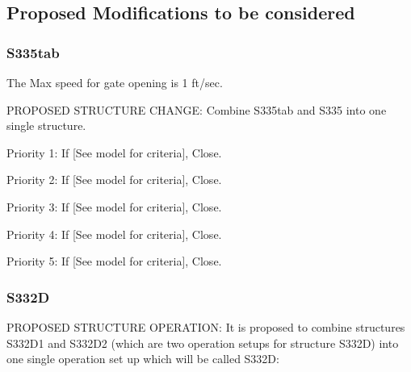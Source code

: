 \clearpage
\subsection{Proposed Modifications to be considered}

\subsubsection{S335tab}

The Max speed for gate opening is 1 ft/sec.

PROPOSED STRUCTURE CHANGE: Combine S335tab and S335 into one single structure.

\begin{packed_items}
\item Priority 1: If \textcolor[rgb]{1.00,0.00,0.00}{[See model for criteria]}, Close.
\item Priority 2: If \textcolor[rgb]{1.00,0.00,0.00}{[See model for criteria]}, Close.
\item Priority 3: If \textcolor[rgb]{1.00,0.00,0.00}{[See model for criteria]}, Close.
\item Priority 4: If \textcolor[rgb]{1.00,0.00,0.00}{[See model for criteria]}, Close.
\item Priority 5: If \textcolor[rgb]{1.00,0.00,0.00}{[See model for criteria]}, Close.
\end{packed_items}


\subsubsection{S332D}

PROPOSED STRUCTURE OPERATION: It is proposed to combine structures S332D1 and S332D2 (which are two operation setups for structure S332D) into one single operation set up which will be called S332D:

